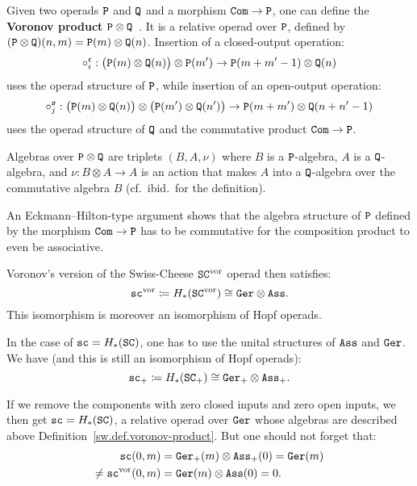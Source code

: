 \begin{definition} \label{sw.def.voronov-product}
  Given two operads $\mathtt{P}$ and $\mathtt{Q}$ and a morphism $\mathtt{Com} \to \mathtt{P}$, one can define the \textbf{Voronov product} $\mathtt{P} \otimes \mathtt{Q}$~\cite{Voronov1999}.
It is a relative operad over $\mathtt{P}$, defined by $(\mathtt{P} \otimes \mathtt{Q})(n,m) = \mathtt{P}(m) \otimes \mathtt{Q}(n)$.
Insertion of a closed-output operation:
  \[ \circ_{i}^{\mathfrak{c}} : \bigl( \mathtt{P}(m) \otimes \mathtt{Q}(n) \bigr) \otimes \mathtt{P}(m') \to \mathtt{P}(m+m'-1) \otimes \mathtt{Q}(n) \]
  uses the operad structure of $\mathtt{P}$, while insertion of an open-output operation:
  \[ \circ_{j}^{\mathfrak{o}} : \bigl( \mathtt{P}(m) \otimes \mathtt{Q}(n) \bigr) \otimes \bigl( \mathtt{P}(m') \otimes \mathtt{Q}(n') \bigr) \to \mathtt{P}(m+m') \otimes \mathtt{Q}(n+n'-1) \]
  uses the operad structure of $\mathtt{Q}$ and the commutative product $\mathtt{Com} \to \mathtt{P}$.
\end{definition}

Algebras over $\mathtt{P} \otimes \mathtt{Q}$ are triplets $(B,A,\nu)$ where $B$ is a $\mathtt{P}$-algebra, $A$ is a $\mathtt{Q}$-algebra, and $\nu : B \otimes A \to A$ is an action that makes $A$ into a $\mathtt{Q}$-algebra over the commutative algebra $B$ (cf.\ ibid.\ for the definition).

\begin{remark}
  An Eckmann--Hilton-type argument shows that the algebra structure of $\mathtt{P}$ defined by the morphism $\mathtt{Com} \to \mathtt{P}$ has to be commutative for the composition product to even be associative.
\end{remark}

Voronov's version of the Swiss-Cheese $\mathtt{SC}^{\mathrm{vor}}$ operad then
satisfies:
\[ \mathtt{sc}^{\mathrm{vor}} \coloneqq H_{*}(\mathtt{SC}^{\mathrm{vor}}) \cong \mathtt{Ger} \otimes \mathtt{Ass}. \]
This isomorphism is moreover an isomorphism of Hopf operads.

In the case of $\mathtt{sc} = H_{*}(\mathtt{SC})$, one has to use the unital structures of $\mathtt{Ass}$ and $\mathtt{Ger}$.
We have (and this is still an isomorphism of Hopf operads):
\[ \mathtt{sc}_{+} \coloneqq H_{*}(\mathtt{SC}_{+}) \cong \mathtt{Ger}_{+} \otimes \mathtt{Ass}_{+}. \]

If we remove the components with zero closed inputs and zero open inputs, we then get $\mathtt{sc} = H_{*}(\mathtt{SC})$, a relative operad over $\mathtt{Ger}$ whose algebras are described above Definition~\ref{sw.def.voronov-product}.
But one should not forget that:
\begin{align*}
  \mathtt{sc}(0,m) & = \mathtt{Ger}_{+}(m) \otimes \mathtt{Ass}_{+}(0) = \mathtt{Ger}(m) \\
  \neq \mathtt{sc}^{\mathrm{vor}}(0,m) & = \mathtt{Ger}(m) \otimes \mathtt{Ass}(0) = 0.
\end{align*}

